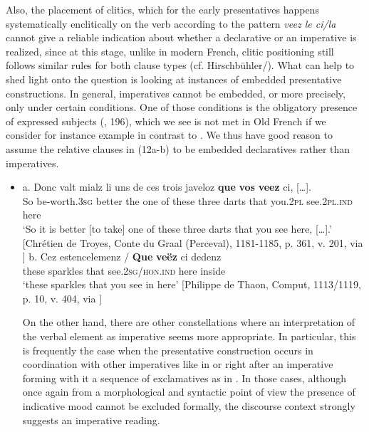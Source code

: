 \documentclass[output=paper]{langscibook}
\begin{document}
\begin{itemize}
\begin{itemize}
\begin{itemize}
\begin{itemize}
\begin{itemize}
\begin{itemize}
\begin{itemize}
\begin{itemize}
\begin{itemize}
\begin{itemize}
Also, the placement of clitics, which for the early presentatives happens systematically enclitically on the verb according to the pattern \textit{veez le ci/la} cannot give a reliable indication about whether a declarative or an imperative is realized, since at this stage, unlike in modern French, clitic positioning still follows similar rules for both clause types (cf. Hirschbühler/\citealt{Labelle2000}). What can help to shed light onto the question is looking at instances of embedded presentative constructions. In general, imperatives cannot be embedded, or more precisely, only under certain conditions. One of those conditions is the obligatory presence of expressed subjects (\citealt{Platzack2007}, 196), which we see is not met in Old French if we consider for instance example  in contrast to . We thus have good reason to assume the relative clauses in (12a-b) to be embedded declaratives rather than imperatives. 

\begin{itemize}
\item \gll \textup{a.} Donc valt mialz li uns de ces trois javeloz \textbf{que} \textbf{vos} \textbf{veez} ci, […].\\
     So be-worth.\textsc{3sg} better the one of these three darts that you.\textsc{2pl} see.\textsc{2pl.ind} here\\
\glt ‘So it is better [to take] one of these three darts that you see here, […].’ [Chrétien de Troyes, Conte du Graal (Perceval), 1181-1185, p. 361, v. 201, via \citealt{BFM2019}]
\z %
\gll \textup{b}. Cez estencelemenz / \textbf{Que} \textbf{veëz} ci dedenz\\
     these sparkles that see.\textsc{2sg/hon.ind}\textbf{ }here inside\\
\glt ‘these sparkles that you see in here’ [Philippe de Thaon, Comput, 1113/1119, p. 10, v. 404, via \citealt{BFM2019}]
\z %

On the other hand, there are other constellations where an interpretation of the verbal element as imperative seems more appropriate. In particular, this is frequently the case when the presentative construction occurs in coordination with other imperatives like in  or right after an imperative forming with it a sequence of exclamatives as in . In those cases, although once again from a morphological and syntactic point of view the presence of indicative mood cannot be excluded formally, the discourse context strongly suggests an imperative reading. 


\end{itemize}
\end{itemize}
\end{itemize}
\end{itemize}
\end{itemize}
\end{itemize}
\end{itemize}
\end{itemize}
\end{itemize}
\end{itemize}
\end{itemize}
\end{document}
